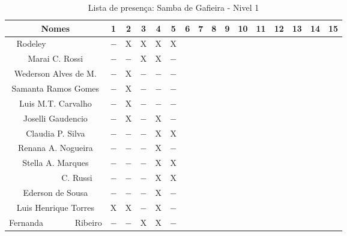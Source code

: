 \documentclass[a4paper,12pt]{article}
\begin{document}
\begin{landscape}
\begin{table}[!htbp]
\vspace*{-2cm}\centering
\caption{Lista de presença: Samba de Gafieira - Nivel 1}
\begin{tabular}{|*{16}{c|}}
\hline%
 Nomes & 1 & 2 & 3 & 4 & 5 & 6 & 7 & 8 & 9 & 10 & 11 & 12 & 13 & 14 & 15  \\ \hline
 \LARGE Rodeley$~~~~~~~~~~~~~~~~~~~~~~~~~~$&$-$ &X   &X   &X   &X  &  &  &  &  &  &  &  &  &  &  \\ \hline
 \LARGE Marai  C. Rossi                    &$-$ &$-$ &X   &X   &$-$ &  &  &  &  &  &  &  &  &  &  \\ \hline
 \LARGE Wederson Alves de M.               &$-$ &X   &$-$ &$-$ &$-$ &  &  &  &  &  &  &  &  &  &  \\ \hline
 \LARGE Samanta Ramos Gomes                &$-$ &X   &$-$ &$-$ &$-$ &  &  &  &  &  &  &  &  &  &  \\ \hline
 \LARGE Luis M.T. Carvalho                 &$-$ &X   &$-$ &$-$ &$-$ &  &  &  &  &  &  &  &  &  &  \\ \hline
 \LARGE Joselli Gaudencio                  &$-$ &X   &$-$ &X   &$-$ &  &  &  &  &  &  &  &  &  &  \\ \hline
 \LARGE Claudia P. Silva                   &$-$ &$-$ &$-$ &X   &X   &  &  &  &  &  &  &  &  &  &  \\ \hline
 \LARGE Renana A. Nogueira                 &$-$ &$-$ &$-$ &X   &$-$ &  &  &  &  &  &  &  &  &  &  \\ \hline
 \LARGE Stella A. Marques                  &$-$ &$-$ &$-$ &X   &X   &  &  &  &  &  &  &  &  &  &  \\ \hline
 \LARGE $~~~~~~~~~~~~~~~~~~~~~~~$C. Russi  &$-$ &$-$ &$-$ &X   &X   &  &  &  &  &  &  &  &  &  &  \\ \hline
 \LARGE Ederson de Sousa                   &$-$ &$-$ &$-$ &X   &$-$ &  &  &  &  &  &  &  &  &  &  \\ \hline
 \LARGE Luis Henrique Torres               &X   &X   &$-$ &X   &$-$ &  &  &  &  &  &  &  &  &  &  \\ \hline
 \LARGE Fernanda $~~~~~~~~~~~~~~$ Ribeiro  &$-$ &$-$ &X   &X   &$-$ &  &  &  &  &  &  &  &  &  &  \\ \hline
 \hline
\end{tabular}
\label{actividades2}
\end{table}


\end{landscape}
\end{document}
